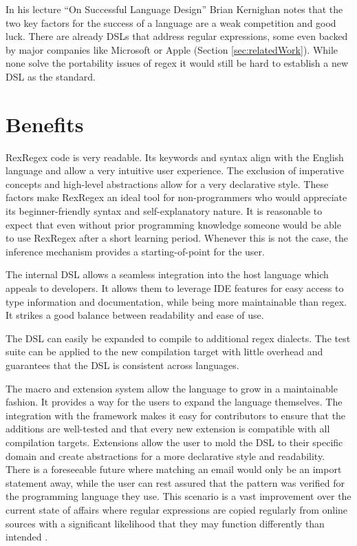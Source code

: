 In his lecture \enquote{On Successful Language Design} \cite{OnSuccessfulLanuageDesignKernighan} Brian Kernighan notes that the two key factors for the success of a language are a weak competition and good luck. There are already DSLs that address regular expressions, some even backed by major companies like Microsoft or Apple (Section \ref{sec:relatedWork}). While none solve the portability issues of regex it would still be hard to establish a new DSL as the standard.

\section{Benefits}
 
RexRegex code is very readable. Its keywords and syntax align with the English language and allow a very intuitive user experience. The exclusion of imperative concepts and high-level abstractions allow for a very declarative style. These factors make RexRegex an ideal tool for non-programmers who would appreciate its beginner-friendly syntax and self-explanatory nature. It is reasonable to expect that even without prior programming knowledge someone would be able to use RexRegex after a short learning period. Whenever this is not the case, the inference mechanism provides a starting-of-point for the user.

The internal DSL allows a seamless integration into the host language which appeals to developers. It allows them to leverage IDE features for easy access to type information and documentation, while being more maintainable than regex. It strikes a good balance between readability and ease of use.

The DSL can easily be expanded to compile to additional regex dialects. The test suite can be applied to the new compilation target with little overhead and guarantees that the DSL is consistent across languages.

The macro and extension system allow the language to grow in a maintainable fashion. It provides a way for the users to expand the language themselves. The integration with the \utgast{} framework makes it easy for contributors to ensure that the additions are well-tested and that every new extension is compatible with all compilation targets. Extensions allow the user to mold the DSL to their specific domain and create abstractions for a more declarative style and readability. There is a foreseeable future where matching an email would only be an import statement away, while the user can rest assured that the pattern was verified for the programming language they use. This scenario is a vast improvement over the current state of affairs where regular expressions are copied regularly from online sources with a significant likelihood that they may function differently than intended \cite{RegexNotLinguaFranca}.

